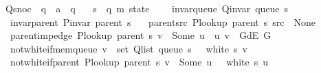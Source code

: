 \begin{isabellebody}
\ \ Q{\isacharunderscore}{\kern0pt}snoc\ {\isacharcolon}{\kern0pt}{\isacharcolon}{\kern0pt}\ {\isachardoublequoteopen}{\isacharprime}{\kern0pt}q\ {\isasymRightarrow}\ {\isacharprime}{\kern0pt}a\ {\isasymRightarrow}\ {\isacharprime}{\kern0pt}q{\isachardoublequoteclose}\ \isanewline
\ \ s\ {\isacharcolon}{\kern0pt}{\isacharcolon}{\kern0pt}\ {\isachardoublequoteopen}{\isacharparenleft}{\kern0pt}{\isacharprime}{\kern0pt}q{\isacharcomma}{\kern0pt}\ {\isacharprime}{\kern0pt}m{\isacharparenright}{\kern0pt}\ state{\isachardoublequoteclose}\ {\isacharplus}{\kern0pt}\isanewline
\ \ \ invar{\isacharunderscore}{\kern0pt}queue{\isacharcolon}{\kern0pt}\ {\isachardoublequoteopen}Q{\isacharunderscore}{\kern0pt}invar\ {\isacharparenleft}{\kern0pt}queue\ s{\isacharparenright}{\kern0pt}{\isachardoublequoteclose}\isanewline
\ \ \ invar{\isacharunderscore}{\kern0pt}parent{\isacharcolon}{\kern0pt}\ {\isachardoublequoteopen}P{\isacharunderscore}{\kern0pt}invar\ {\isacharparenleft}{\kern0pt}parent\ s{\isacharparenright}{\kern0pt}{\isachardoublequoteclose}\isanewline
\ \ \ parent{\isacharunderscore}{\kern0pt}src{\isacharcolon}{\kern0pt}\ {\isachardoublequoteopen}P{\isacharunderscore}{\kern0pt}lookup\ {\isacharparenleft}{\kern0pt}parent\ s{\isacharparenright}{\kern0pt}\ src\ {\isacharequal}{\kern0pt}\ None{\isachardoublequoteclose}\isanewline
\ \ \ parent{\isacharunderscore}{\kern0pt}imp{\isacharunderscore}{\kern0pt}edge{\isacharcolon}{\kern0pt}\ {\isachardoublequoteopen}P{\isacharunderscore}{\kern0pt}lookup\ {\isacharparenleft}{\kern0pt}parent\ s{\isacharparenright}{\kern0pt}\ v\ {\isacharequal}{\kern0pt}\ Some\ u\ {\isasymLongrightarrow}\ {\isacharparenleft}{\kern0pt}u{\isacharcomma}{\kern0pt}\ v{\isacharparenright}{\kern0pt}\ {\isasymin}\ G{\isachardot}{\kern0pt}dE\ G{\isachardoublequoteclose}\isanewline
\ \ \ not{\isacharunderscore}{\kern0pt}white{\isacharunderscore}{\kern0pt}if{\isacharunderscore}{\kern0pt}mem{\isacharunderscore}{\kern0pt}queue{\isacharcolon}{\kern0pt}\ {\isachardoublequoteopen}v\ {\isasymin}\ set\ {\isacharparenleft}{\kern0pt}Q{\isacharunderscore}{\kern0pt}list\ {\isacharparenleft}{\kern0pt}queue\ s{\isacharparenright}{\kern0pt}{\isacharparenright}{\kern0pt}\ {\isasymLongrightarrow}\ {\isasymnot}\ white\ s\ v{\isachardoublequoteclose}\isanewline
\ \ \ not{\isacharunderscore}{\kern0pt}white{\isacharunderscore}{\kern0pt}if{\isacharunderscore}{\kern0pt}parent{\isacharcolon}{\kern0pt}\ {\isachardoublequoteopen}P{\isacharunderscore}{\kern0pt}lookup\ {\isacharparenleft}{\kern0pt}parent\ s{\isacharparenright}{\kern0pt}\ v\ {\isacharequal}{\kern0pt}\ Some\ u\ {\isasymLongrightarrow}\ {\isasymnot}\ white\ s\ u{\isachardoublequoteclose}\isanewline

\end{isabellebody}
